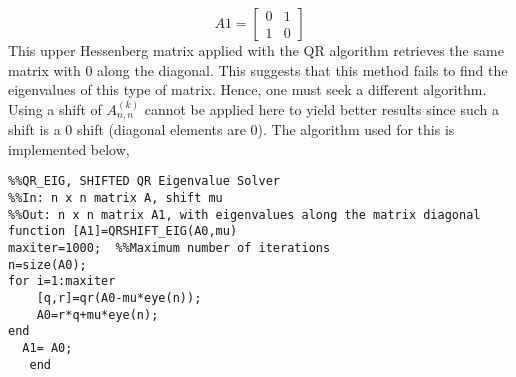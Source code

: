 \documentclass{article}
\begin{document}
  $$ A1 =
  \begin{bmatrix} 
  0& 1 \\ 
  1 &0 
  \end{bmatrix}$$ 
  This upper Hessenberg matrix applied with the QR algorithm retrieves the same matrix with 0 along the diagonal. This suggests that this method fails to find the eigenvalues of this type of matrix. Hence, one must seek a different algorithm. Using a shift of $A_{n,n}^{(k)}$ cannot be applied here to yield better results since such a shift is a 0 shift (diagonal elements are 0). The algorithm used for this is implemented below, 
\newline 
\begin{lstlisting} 
%%QR_EIG, SHIFTED QR Eigenvalue Solver 
%%In: n x n matrix A, shift mu  
%%Out: n x n matrix A1, with eigenvalues along the matrix diagonal 
function [A1]=QRSHIFT_EIG(A0,mu)  
maxiter=1000;  %%Maximum number of iterations 
n=size(A0); 
for i=1:maxiter 
    [q,r]=qr(A0-mu*eye(n)); 
    A0=r*q+mu*eye(n); 
end 
  A1= A0; 
   end
\end{lstlisting} 
\end{document}
